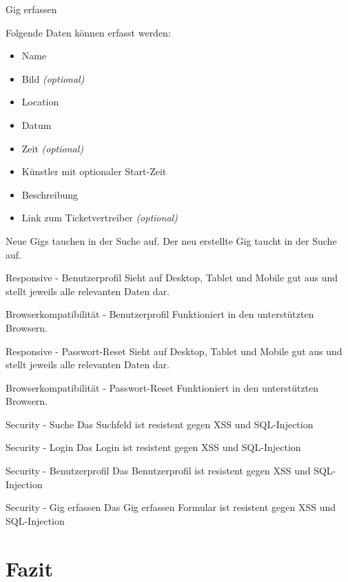 \clearpage

\acceptancetest
{Gig erfassen}
{Folgende Daten können erfasst werden:
  \begin{itemize}
    \tightlist{}
    \item{} Name
    \item{} Bild \textit{(optional)}
    \item{} Location
    \item{} Datum
    \item{} Zeit \textit{(optional)}
    \item{} Künstler mit optionaler Start-Zeit
    \item{} Beschreibung
    \item{} Link zum Ticketvertreiber \textit{(optional)}
  \end{itemize}}

\acceptancetest
{Neue Gigs tauchen in der Suche auf.}
{Der neu erstellte Gig taucht in der Suche auf.}

\clearpage

\acceptancetest
{Responsive - Benutzerprofil}
{Sieht auf Desktop, Tablet und Mobile gut aus und stellt jeweils alle relevanten Daten dar.}

\acceptancetest
{Browserkompatibilität - Benutzerprofil}
{Funktioniert in den unterstützten Browsern.}

\clearpage

\acceptancetest
{Responsive - Passwort-Reset}
{Sieht auf Desktop, Tablet und Mobile gut aus und stellt jeweils alle relevanten Daten dar.}

\acceptancetest
{Browserkompatibilität - Passwort-Reset}
{Funktioniert in den unterstützten Browsern.}

\clearpage

\acceptancetest
{Security - Suche}
{Das Suchfeld ist resistent gegen XSS und SQL-Injection}

\acceptancetest
{Security - Login}
{Das Login ist resistent gegen XSS und SQL-Injection}

\clearpage

\acceptancetest
{Security - Benutzerprofil}
{Das Benutzerprofil ist resistent gegen XSS und SQL-Injection}

\acceptancetest
{Security - Gig erfassen}
{Das Gig erfassen Formular ist resistent gegen XSS und SQL-Injection}

\clearpage
\section{Fazit}\label{konzept-fazit}

